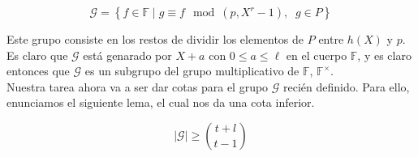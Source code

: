 \[ \mathcal{G} = \left\{ f \in \mathbb{F} \mid g \equiv f \mod(p, X^r - 1),\;\;g \in P \right\} \]

Este grupo consiste en los restos de dividir los elementos de $P$ entre $h(X)$ y $p$. Es claro que $\mathcal{G}$ está genarado por $X + a$ con $0\leq a \leq \ell$ en el cuerpo $\mathbb{F}$, y es claro entonces que $\mathcal{G}$ es un subgrupo del grupo multiplicativo de $\mathbb{F}$, $\mathbb{F}^\times$.\\

Nuestra tarea ahora va a ser dar cotas para el grupo $\mathcal{G}$ recién definido. Para ello, enunciamos el siguiente lema, el cual nos da una cota inferior.

\begin{lema}\label{cota_inferior_G}
	\[ |\mathcal{G}| \geq \binom{t+l}{t-1} \]
\end{lema}

